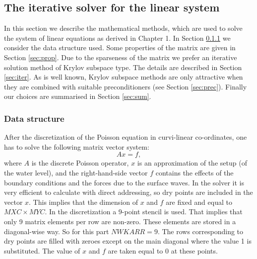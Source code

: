 \documentclass[12pt]{book}
\begin{document}
\subsection{The iterative solver for the linear system}
In this section we describe the mathematical methods, which are used to
solve the system of linear equations as derived in Chapter 1. In
Section \ref{sec:data} we consider the data structure used.
Some properties of the matrix are given in Section \ref{sec:prop}.
Due to the sparseness of the matrix we prefer an iterative solution
method of Krylov subspace type. The details are described in Section
\ref{sec:iter}.
As is well known, Krylov subspace methods are only attractive when
they are combined with suitable preconditioners (see Section
\ref{sec:prec}). Finally our choices are summarised in Section
\ref{sec:sum}.
\subsubsection{Data structure}
\label{sec:data}
After the discretization of the Poisson equation in curvi-linear
co-ordinates, one has to solve the following matrix vector system:
\begin{equation}
A x = f,
\label{eq:matvec}
\end{equation}
where $A$ is the discrete Poisson operator, $x$ is an approximation of
the setup (of the water level), and the right-hand-side vector $f$
contains the effects of the boundary conditions and the forces due to
the surface waves. In the solver it is very efficient to calculate with
direct addressing, so dry points are included in the vector $x$. This
implies that the dimension of $x$ and $f$ are fixed and equal to $MXC
\times MYC$. In the discretization a 9-point stencil is used.  That
implies that only 9 matrix elements per row are non-zero. These elements
are stored in a diagonal-wise way.  So for this part $NWKARR = 9$. The
rows corresponding to dry points are filled with zeroes except on the
main diagonal where the value 1 is substituted. The value of $x$ and $f$
are taken equal to 0 at these points.
\end{document}
